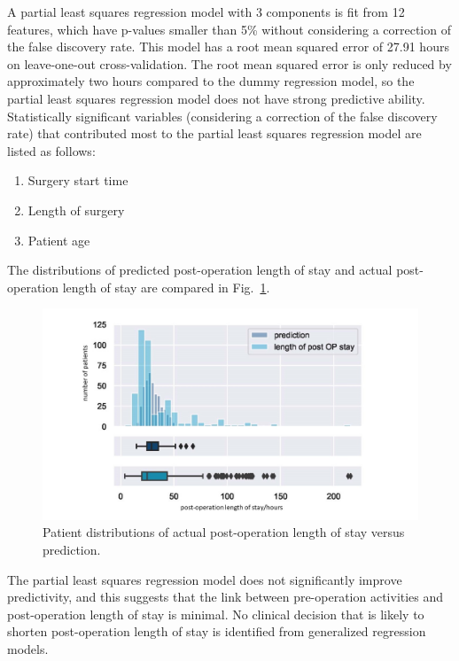 \documentclass{elsarticle}
\begin{document}
A partial least squares regression model with 3 components is fit from 12 features, which have p-values smaller than 5\% without considering a correction of the false discovery rate. This model has a root mean squared error of 27.91 hours on leave-one-out cross-validation. The root mean squared error is only reduced by approximately two hours compared to the dummy regression model, so the partial least squares regression model does not have strong predictive ability. Statistically significant variables (considering a correction of the false discovery rate) that contributed most to the partial least squares regression model are listed as follows:

\begin{enumerate}
    \item Surgery start time
    \item Length of surgery
    \item Patient age
\end{enumerate}

The distributions of predicted post-operation length of stay and actual post-operation length of stay are compared in Fig.~\ref{fig:regression distribution}.

\begin{figure}[t]
\centering
\includegraphics[width=\textwidth]{images/akl_pls_regression_distribution.jpg}
\caption{Patient distributions of actual post-operation length of stay versus prediction.}
\label{fig:regression distribution}
\end{figure}

The partial least squares regression model does not significantly improve predictivity, and this suggests that the link between pre-operation activities and post-operation length of stay is minimal. No clinical decision that is likely to shorten post-operation length of stay is identified from generalized regression models.
\end{document}
